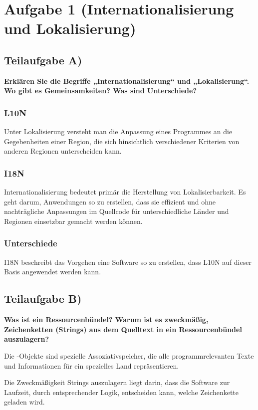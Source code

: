 \section{Aufgabe 1 (Internationalisierung und Lokalisierung)}

\subsection{Teilaufgabe A)}
\textbf{Erklären Sie die Begriffe „Internationalisierung“ und „Lokalisierung“. Wo gibt es
Gemeinsamkeiten? Was sind Unterschiede?}

\subsubsection{L10N}
Unter Lokalisierung versteht man die Anpassung eines Programmes an die
Gegebenheiten einer Region, die sich hinsichtlich verschiedener Kriterien von
anderen Regionen unterscheiden kann.

\subsubsection{I18N}
Internationalisierung bedeutet primär die Herstellung von Lokalisierbarkeit. Es
geht darum, Anwendungen so zu erstellen, dass sie effizient und ohne
nachträgliche Anpassungen im Quellcode für unterschiedliche Länder und Regionen
einsetzbar gemacht werden können.

\subsubsection{Unterschiede}
I18N beschreibt das Vorgehen eine Software so zu erstellen, dass L10N auf dieser
Basis angewendet werden kann.

\subsection{Teilaufgabe B)}
\textbf{Was ist ein Ressourcenbündel? Warum ist es zweckmäßig, Zeichenketten (Strings) aus
dem Quelltext in ein Ressourcenbündel auszulagern?}
 
Die -Objekte sind spezielle Assoziativspeicher, die alle
programmrelevanten Texte und Informationen für ein spezielles Land
repräsentieren. 

Die Zweckmäßigkeit Strings auszulagern liegt darin, dass die Software zur
Laufzeit, durch entsprechender Logik, entscheiden kann, welche Zeichenkette
geladen wird.

